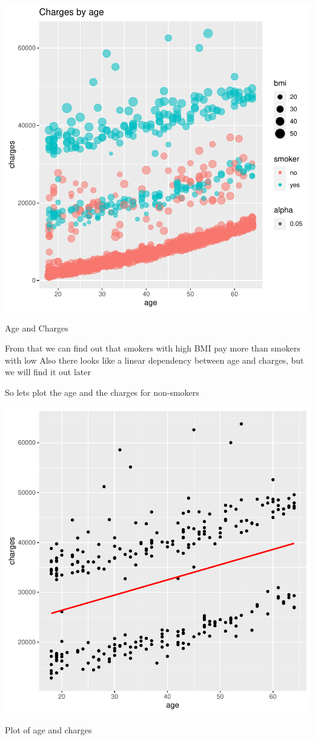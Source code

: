 \documentclass{article}
\begin{document}
\begin{centerfig}
\includegraphics{Untitled-045}
\caption{Age and Charges}
\end{centerfig}

From that we can find out that smokers with high BMI pay more than smokers with low
Also there looks like a linear dependency between age and charges, but we will find it out later

So lets plot the age and the charges for non-smokers

\begin{centerfig}
\includegraphics{Untitled-046}
\caption{Plot of age and charges}
\end{centerfig}
\end{document}
